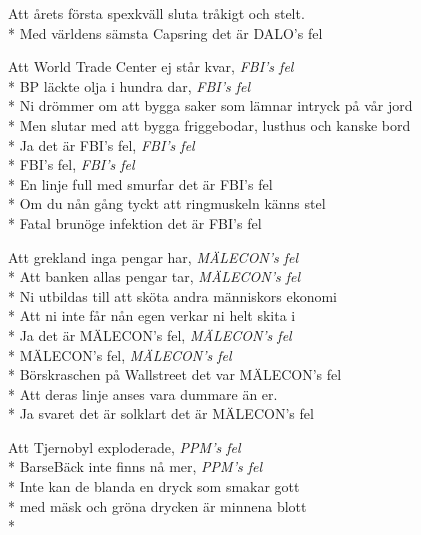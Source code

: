 \begin{SongText}
\begin{SongVerse}
        Att årets första spexkväll sluta tråkigt och stelt.\\*%
        Med världens sämsta Capsring det är DALO's fel
    \end{SongVerse}
    \begin{SongVerse}
        Att World Trade Center ej står kvar, \textit{FBI's fel}\\*%
        BP läckte olja i hundra dar, \textit{FBI's fel}\\*%
        Ni drömmer om att bygga saker som lämnar intryck på vår jord\\*%
        Men slutar med att bygga friggebodar, lusthus och kanske bord\\*%
        Ja det är FBI's fel, \textit{FBI's fel}\\*%
        FBI's fel, \textit{FBI's fel}\\*%
        En linje full med smurfar det är FBI's fel\\*%
        Om du nån gång tyckt att ringmuskeln känns stel\\*%
        Fatal brunöge infektion det är FBI's fel
    \end{SongVerse}
    \begin{SongVerse}
        Att grekland inga pengar har, \textit{MÄLECON's fel}\\*%
        Att banken allas pengar tar, \textit{MÄLECON's fel}\\*%
        Ni utbildas till att sköta andra människors ekonomi\\*%
        Att ni inte får nån egen verkar ni helt skita i\\*%
        Ja det är MÄLECON's fel, \textit{MÄLECON's fel}\\*%
        MÄLECON's fel, \textit{MÄLECON's fel}\\*%
        Börskraschen på Wallstreet det var MÄLECON's fel\\*%
        Att deras linje anses vara dummare än er.\\*%
        Ja svaret det är solklart det är MÄLECON's fel
    \end{SongVerse}
    \begin{SongVerse}
        Att Tjernobyl exploderade, \textit{PPM's fel}\\*%
        BarseBäck inte finns nå mer, \textit{PPM's fel}\\*%
        Inte kan de blanda en dryck som smakar gott\\*%
        med mäsk och gröna drycken är minnena blott\\*%

\end{SongVerse}
\end{SongText}
